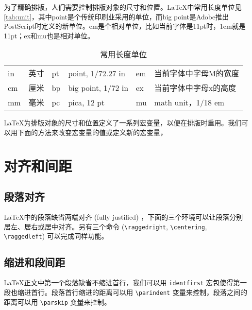 为了精确排版，人们需要控制排版对象的尺寸和位置。\LaTeX 中常用长度单位见 \autoref{tab:unit}，其中point是个传统印刷业采用的单位，而big point是Adobe推出PostScript时定义的新单位。em是个相对单位，比如当前字体是11pt时，1em就是11pt；ex和mu也是相对单位。

\begin{table}[htbp]
\caption{常用长度单位}
\label{tab:unit}
\centering
\begin{tabular}{llllll}
    \toprule
    in & 英寸 & pt & point, 1/72.27 in  & em & 当前字体中字母M的宽度 \\
    cm & 厘米 & bp & big point, 1/72 in & ex & 当前字体中字母x的高度 \\
    mm & 毫米 & pc & pica, 12 pt        & mu & math unit，1/18 em \\
    \bottomrule
\end{tabular}
\end{table}

\LaTeX 为排版对象的尺寸和位置定义了一系列宏变量，以便在排版时重用。我们可以用下面的方法来改变宏变量的值或定义新的宏变量，

\begin{Code}[]
\setlength{`变量名`}   %
\addtolength{`变量名`} %
\end{Code}

\section{对齐和间距}

\subsection{段落对齐}

\LaTeX 中的段落缺省两端对齐 (fully justified) ，下面的三个环境可以让段落分别居左、居右或居中对齐。另有三个命令 (\verb|\raggedright|, \verb|\centering|, \verb|\raggedleft|) 可以完成同样功能。

\begin{example}[h]
\caption{段落对齐方式}
\end{example}

\subsection{缩进和段间距}
\label{sec:parskip}

\LaTeX 正文中第一个段落缺省不缩进首行，我们可以用 \texttt{identfirst} 宏包使得第一段也缩进首行。段落首行缩进的距离可以用 \verb|\parindent| 变量来控制，段落之间的距离可以用 \verb|\parskip| 变量来控制。


